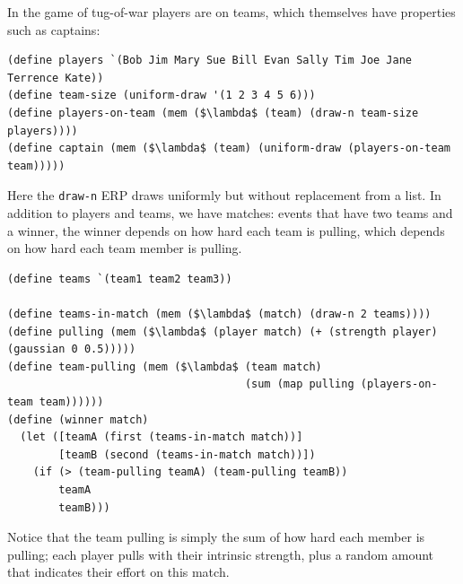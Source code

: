 \documentclass[12pt]{article}
\begin{document}
In the game of tug-of-war players are on teams, which themselves have properties such as captains:
\begin{lstlisting}[mathescape]
(define players `(Bob Jim Mary Sue Bill Evan Sally Tim Joe Jane Terrence Kate))
(define team-size (uniform-draw '(1 2 3 4 5 6)))
(define players-on-team (mem ($\lambda$ (team) (draw-n team-size players))))
(define captain (mem ($\lambda$ (team) (uniform-draw (players-on-team team)))))
\end{lstlisting}
Here the \lstinline{draw-n} ERP draws uniformly but without replacement from a list.
%
In addition to players and teams, we have matches: events that have two teams and a winner, the winner depends on how hard each team is pulling, which depends on how hard each team member is pulling.
\begin{lstlisting}[mathescape]
(define teams `(team1 team2 team3))

(define teams-in-match (mem ($\lambda$ (match) (draw-n 2 teams))))
(define pulling (mem ($\lambda$ (player match) (+ (strength player) (gaussian 0 0.5)))))
(define team-pulling (mem ($\lambda$ (team match) 
                                     (sum (map pulling (players-on-team team))))))
(define (winner match) 
  (let ([teamA (first (teams-in-match match))]
        [teamB (second (teams-in-match match))])
    (if (> (team-pulling teamA) (team-pulling teamB))
        teamA
        teamB)))
\end{lstlisting}
Notice that the team pulling is simply the sum of how hard each member is pulling; each player pulls with their intrinsic strength, plus a random amount that indicates their effort on this match. 
 
\end{document}
